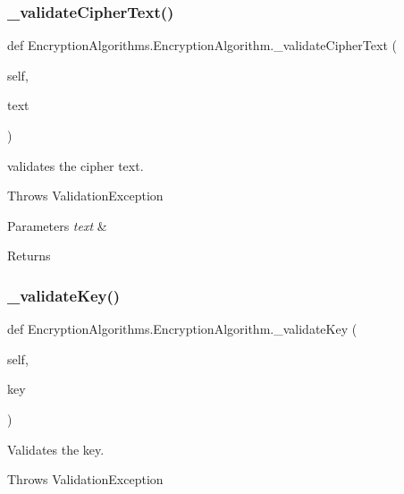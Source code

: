 \subsubsection{\texorpdfstring{\+\_\+validate\+Cipher\+Text()}{\_validateCipherText()}}
{\footnotesize\ttfamily def Encryption\+Algorithms.\+Encryption\+Algorithm.\+\_\+validate\+Cipher\+Text (\begin{DoxyParamCaption}\item[{}]{self,  }\item[{}]{text }\end{DoxyParamCaption})\hspace{0.3cm}{\ttfamily [private]}}



validates the cipher text. 

Throws Validation\+Exception


\begin{DoxyParams}{Parameters}
{\em text} & \\
\hline
\end{DoxyParams}
\begin{DoxyReturn}{Returns}

\end{DoxyReturn}
\mbox{\label{classEncryptionAlgorithms_1_1EncryptionAlgorithm_af28e6d27846bd1690122b68edb95a486}} 
\subsubsection{\texorpdfstring{\+\_\+validate\+Key()}{\_validateKey()}}
{\footnotesize\ttfamily def Encryption\+Algorithms.\+Encryption\+Algorithm.\+\_\+validate\+Key (\begin{DoxyParamCaption}\item[{}]{self,  }\item[{}]{key }\end{DoxyParamCaption})\hspace{0.3cm}{\ttfamily [private]}}



Validates the key. 

Throws Validation\+Exception


